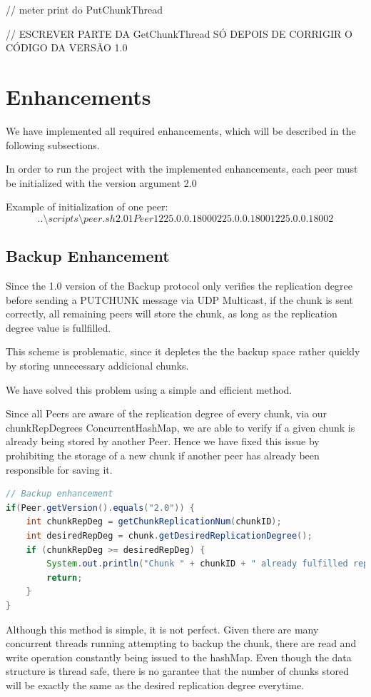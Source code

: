 \documentclass[11pt]{article}
\begin{document}
// meter print do PutChunkThread

// ESCREVER PARTE DA GetChunkThread SÓ DEPOIS DE CORRIGIR O CÓDIGO DA VERSÃO 1.0

\section{Enhancements}

We have implemented all required enhancements, which will be described in the following subsections.

In order to run the project with the implemented enhancements, each peer must be initialized with the version argument 2.0

Example of initialization of one peer:
\[..\setminus scripts\setminus peer.sh 2.0 1 Peer1 225.0.0.1 8000 225.0.0.1 8001 225.0.0.1 8002\]

\subsection{Backup Enhancement}
Since the 1.0 version of the Backup protocol only verifies the replication degree before sending a PUTCHUNK message via UDP Multicast, if the chunk is sent correctly,
all remaining peers will store the chunk, as long as the replication degree value is fullfilled.

This scheme is problematic, since it depletes the the backup space rather quickly by storing unnecessary addicional chunks.

We have solved this problem using a simple and efficient method.

Since all Peers are aware of the replication degree of every chunk, via our chunkRepDegrees ConcurrentHashMap, we are able to verify if a given chunk is already being stored
by another Peer. Hence we have fixed this issue by prohibiting the storage of a new chunk if another peer has already been responsible for saving it.

\begin{lstlisting}[language=java]
// Backup enhancement
if(Peer.getVersion().equals("2.0")) {
	int chunkRepDeg = getChunkReplicationNum(chunkID);
	int desiredRepDeg = chunk.getDesiredReplicationDegree();
	if (chunkRepDeg >= desiredRepDeg) {
		System.out.println("Chunk " + chunkID + " already fulfilled repDegree. Ignoring chunk...");
		return;
	}
}
\end{lstlisting}

Although this method is simple, it is not perfect.
Given there are many concurrent threads running attempting to backup the chunk, there are read and write operation constantly being issued to the hashMap.
Even though the data structure is thread safe, there is no garantee that the number of chunks stored will be exactly the same as the desired replication degree everytime.
\end{document}
